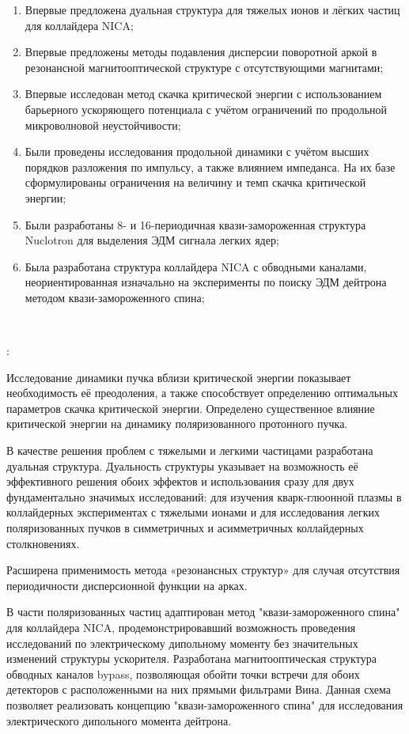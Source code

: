 \begin{enumerate}[beginpenalty=10000] %
	\item	Впервые предложена дуальная структура для тяжелых ионов и лёгких частиц для коллайдера NICA;
	\item 	Впервые предложены методы подавления дисперсии поворотной аркой в резонансной магнитооптической структуре с отсутствующими магнитами;
	\item 	Впервые исследован метод скачка критической энергии с использованием барьерного ускоряющего потенциала с учётом ограничений по продольной микроволновой неустойчивости;
	\item	Были проведены исследования продольной динамики с учётом высших порядков разложения по импульсу, а также влиянием импеданса. На их базе сформулированы ограничения на величину и темп скачка критической энергии;
	\item	Были разработаны 8- и 16-периодичная квази-замороженная структура Nuclotron для выделения ЭДМ сигнала легких ядер;
	\item	Была разработана структура коллайдера NICA с обводными каналами, неориентированная изначально на эксперименты по поиску ЭДМ дейтрона методом квази-замороженного спина;
\end{enumerate}
~\\
\par {\influence}:
\par Исследование динамики пучка вблизи критической энергии показывает необходимость её преодоления, а также  способствует определению оптимальных параметров скачка критической энергии. Определено существенное влияние критической энергии на динамику поляризованного протонного пучка.

\par В качестве решения проблем с тяжелыми и легкими частицами разработана дуальная структура. Дуальность структуры указывает на возможность её эффективного решения обоих эффектов и использования сразу для двух фундаментально значимых исследований: для изучения кварк-глюонной плазмы в коллайдерных экспериментах с тяжелыми ионами и для исследования легких поляризованных пучков в симметричных и асимметричных коллайдерных столкновениях.

\par Расширена применимость метода «резонансных структур» для случая отсутствия периодичности дисперсионной функции на арках.

\par В части поляризованных частиц адаптирован метод "квази-замороженного спина" для коллайдера NICA, продемонстрировавший возможность проведения исследований по электрическому дипольному моменту без значительных изменений структуры ускорителя. Разработана магнитооптическая структура обводных каналов bypass, позволяющая обойти точки встречи для обоих детекторов с расположенными на них прямыми фильтрами Вина. Данная схема позволяет реализовать концепцию "квази-замороженного спина" для исследования электрического дипольного момента дейтрона. 

